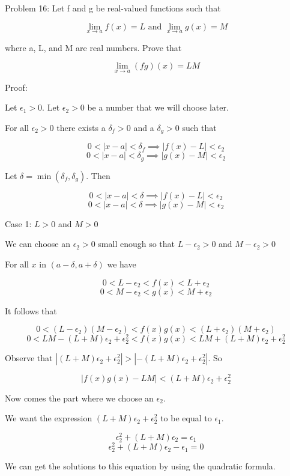   Problem 16: Let f and g be real-valued functions such that

    $$ \lim_{x \rightarrow a} f(x) = L \text{ and } \lim_{x \rightarrow a} g(x) = M $$

where a, L, and M are real numbers. Prove that

    $$ \lim_{x \rightarrow a} (fg)(x) = LM $$

Proof:

Let $\epsilon_1 > 0$. Let $\epsilon_2 > 0$ be a number that we will choose later.

For all $\epsilon_2 > 0$ there exists a $\delta_f > 0$ and a $\delta_g > 0$ such that

    $$ 0 < |x - a| < \delta_f \implies |f(x) - L| < \epsilon_2 $$
    $$ 0 < |x - a| < \delta_g \implies |g(x) - M| < \epsilon_2 $$

Let $\delta = \min(\delta_f, \delta_g)$. Then

    $$ 0 < |x - a| < \delta \implies |f(x) - L| < \epsilon_2 $$
    $$ 0 < |x - a| < \delta \implies |g(x) - M| < \epsilon_2 $$

Case 1: $L > 0$ and $M > 0$

We can choose an $\epsilon_2 > 0$ small enough so that $L - \epsilon_2 > 0$ and $M - \epsilon_2 > 0$

For all $x$ in $(a - \delta, a + \delta)$ we have

    $$ 0 < L - \epsilon_2 < f(x) < L + \epsilon_2 $$
    $$ 0 < M - \epsilon_2 < g(x) < M + \epsilon_2 $$

It follows that

    $$ 0 < (L - \epsilon_2)(M - \epsilon_2) < f(x)g(x) < (L + \epsilon_2)(M + \epsilon_2) $$
    $$ 0 < LM - (L + M)\epsilon_2 + \epsilon_2^2 < f(x)g(x) < LM + (L + M)\epsilon_2 + \epsilon_2^2 $$

Observe that $|(L + M)\epsilon_2 + \epsilon_2^2| > |-(L + M)\epsilon_2 + \epsilon_2^2|$. So

    $$ |f(x)g(x) - LM| < (L + M)\epsilon_2 + \epsilon_2^2 $$

Now comes the part where we choose an $\epsilon_2$.

We want the expression $(L + M)\epsilon_2 + \epsilon_2^2$ to be equal to $\epsilon_1$.

    $$ \epsilon_2^2 + (L + M)\epsilon_2 = \epsilon_1 $$
    $$ \epsilon_2^2 + (L + M)\epsilon_2 - \epsilon_1 = 0 $$

We can get the solutions to this equation by using the quadratic formula.

